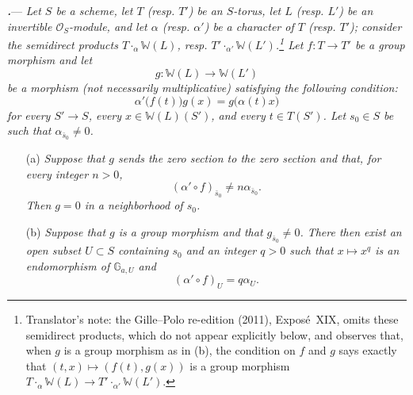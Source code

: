 \par\medskip\noindent
\textbf{\textit{.}}---
\textit{Let \(S\) be a scheme, let \(T\) \textup{(resp. \(T'\))} be
an \(S\)-torus, let \(L\) \textup{(resp. \(L'\))} be an invertible
\(\mathcal O_S\)-module, and let \(\alpha\)
\textup{(resp. \(\alpha'\))} be a character of \(T\)
\textup{(resp. \(T'\))}; consider the semidirect products
\(T\mathbin{\cdot_\alpha}\mathbb W(L)\), resp.
\(T'\mathbin{\cdot_{\alpha'}}\mathbb W(L')\).\footnote{Translator's note: the Gille--Polo re-edition (2011), Exposé~XIX, omits
these semidirect products, which do not appear explicitly below, and observes
that, when \(g\) is a group morphism as in (b), the condition on \(f\) and
\(g\) says exactly that \((t,x)\mapsto(f(t),g(x))\) is a group morphism
\(T\mathbin{\cdot_\alpha}\mathbb W(L)\to T'\mathbin{\cdot_{\alpha'}}\mathbb W(L')\).}  Let \(f\colon T\to T'\) be a group
morphism and let
\[
  g\colon\mathbb W(L)\longrightarrow\mathbb W(L')
\]
be a morphism \textup{(not necessarily multiplicative)} satisfying the
following condition:}
\[
  \alpha'\bigl(f(t)\bigr)g(x)
  =
  g\bigl(\alpha(t)x\bigr)
\]
\textit{for every \(S'\to S\), every \(x\in\mathbb W(L)(S')\), and
every \(t\in T(S')\).  Let \(s_0\in S\) be such that
\(\alpha_{\bar s_0}\ne0\).}

\begin{enumerate}
\item[\textup{(a)}]
\textit{Suppose that \(g\) sends the zero section to the zero section
and that, for every integer \(n>0\),}
\[
  (\alpha'\circ f)_{\bar s_0}\ne n\alpha_{\bar s_0}.
\]
\textit{Then \(g=0\) in a neighborhood of \(s_0\).}

\item[\textup{\SGAInlineRefTarget{sga3:xix:proposition:4-12:item:b}\SGAInlineRefTarget{sga3:xix:paragraph:4:11:item:b}(b)}]
\textit{Suppose that \(g\) is a group morphism and that
\(g_{\bar s_0}\ne0\).  There then exist an open subset \(U\subset S\)
containing \(s_0\) and an integer \(q>0\) such that
\(x\longmapsto x^q\) is an endomorphism of
\(\mathbb G_{a,U}\) and}
\[
  (\alpha'\circ f)_U=q\alpha_U.
\]
\end{enumerate}

